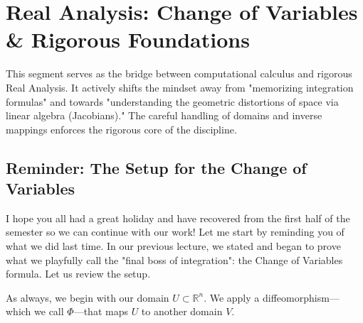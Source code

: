 \chapter{Real Analysis: Change of Variables \& Rigorous Foundations}

\begin{nice-box}
This segment serves as the bridge between computational calculus and rigorous Real Analysis. It actively shifts the mindset away from "memorizing integration formulas" and towards "understanding the geometric distortions of space via linear algebra (Jacobians)." The careful handling of domains and inverse mappings enforces the rigorous core of the discipline.
\end{nice-box}


\section{Reminder: The Setup for the Change of Variables}

\begin{spoken_clean}[00:00:11 - 00:01:29]
I hope you all had a great holiday and have recovered from the first half of the semester so we can continue with our work! Let me start by reminding you of what we did last time. In our previous lecture, we stated and began to prove what we playfully call the "final boss of integration": the Change of Variables formula. Let us review the setup. 

As always, we begin with our domain $U \subset \mathbb{R}^n$. We apply a diffeomorphism—which we call $\Phi$—that maps $U$ to another domain $V$. 
\end{spoken_clean}

